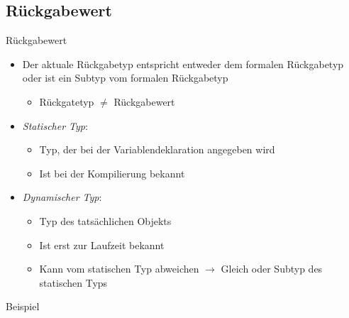 \documentclass{../tuda-beamer}
\begin{document}
    \subsection{Rückgabewert}
    \label{subsec:kovarianz-rückgabewert}
    \begin{frame}[c]{Rückgabewert}
        \begin{itemize}
            \item Der aktuale Rückgabetyp entspricht entweder dem formalen Rückgabetyp oder ist
            ein Subtyp vom formalen Rückgabetyp
            \begin{itemize}
                \item Rückgatetyp \(\neq\) Rückgabewert
            \end{itemize}
        \end{itemize}

        \begin{note}[title=Rückblick:]
            \begin{itemize}
                \item \emph{Statischer Typ}:
                \begin{itemize}
                    \item Typ, der bei der Variablendeklaration angegeben wird
                    \item Ist bei der Kompilierung bekannt
                \end{itemize}
                \item \emph{Dynamischer Typ}:
                \begin{itemize}
                    \item Typ des tatsächlichen Objekts
                    \item Ist erst zur Laufzeit bekannt
                    \item Kann vom statischen Typ abweichen \(\rightarrow\) Gleich oder Subtyp des statischen
                    Typs
                \end{itemize}
            \end{itemize}
        \end{note}
    \end{frame}

    \begin{frame}[c]{Beispiel}
        
    \end{frame}

    \begin{frame}[c]
        
    \end{frame}
\end{document}
